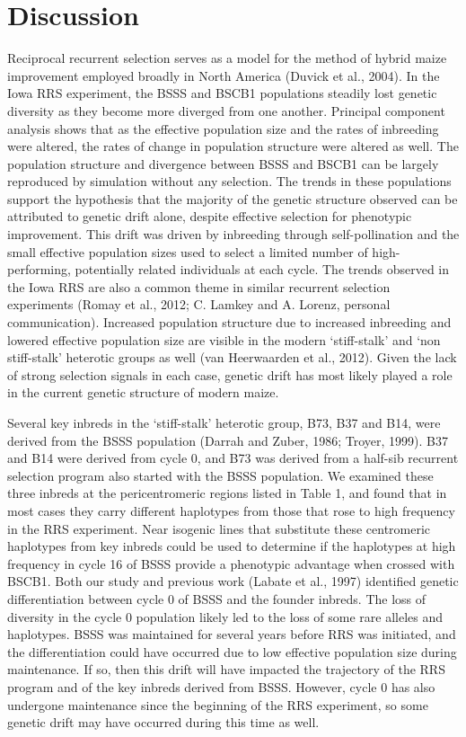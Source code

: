 \section*{Discussion}
Reciprocal recurrent selection serves as a model for the method of hybrid maize improvement employed broadly in North America (Duvick et al., 2004). 
In the Iowa RRS experiment, the BSSS and BSCB1 populations steadily lost genetic diversity as they become more diverged from one another. Principal component analysis shows that as the effective population size and the rates of inbreeding were altered, the rates of change in population structure were altered as well. The population structure and divergence between BSSS and BSCB1 can be largely reproduced by simulation without any selection. The trends in these populations support the hypothesis that the majority of the genetic structure observed can be attributed to genetic drift alone, despite effective selection for phenotypic improvement. This drift was driven by inbreeding through self-pollination and the small effective population sizes used to select a limited number of high-performing, potentially related individuals at each cycle.  The trends observed in the Iowa RRS are also a common theme in similar recurrent selection experiments (Romay et al., 2012; C. Lamkey and A. Lorenz, personal communication). Increased population structure due to increased inbreeding and lowered effective population size are visible in the modern ‘stiff-stalk’ and ‘non stiff-stalk’ heterotic groups as well (van Heerwaarden et al., 2012). Given the lack of strong selection signals in each case, genetic drift has most likely played a role in the current genetic structure of modern maize. 
	
	Several key inbreds in the ‘stiff-stalk’ heterotic group, B73, B37 and B14, were derived from the BSSS population (Darrah and Zuber, 1986; Troyer, 1999). B37 and B14 were derived from cycle 0, and B73 was derived from a half-sib recurrent selection program also started with the BSSS population. We examined these three inbreds at the pericentromeric regions listed in Table 1, and found that in most cases they carry different haplotypes from those that rose to high frequency in the RRS experiment.  Near isogenic lines that substitute these centromeric haplotypes from key inbreds could be used to determine if the haplotypes at high frequency in cycle 16 of BSSS provide a phenotypic advantage when crossed with BSCB1. 
	Both our study and previous work (Labate et al., 1997) identified genetic differentiation between cycle 0 of BSSS and the founder inbreds. The loss of diversity in the cycle 0 population likely led to the loss of some rare alleles and haplotypes. BSSS was maintained for several years before RRS was initiated, and the differentiation could have occurred due to low effective population size during maintenance. If so, then this drift will have impacted the trajectory of the RRS program and of the key inbreds derived from BSSS. However, cycle 0 has also undergone maintenance since the beginning of the RRS experiment, so some genetic drift may have occurred during this time as well.
	
